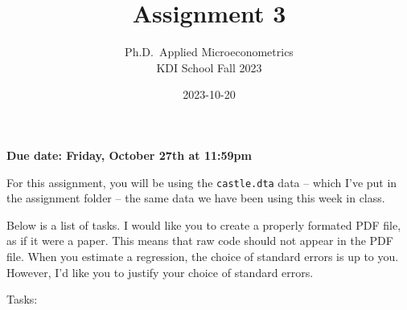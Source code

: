 \documentclass[
]{article}
\title{Assignment 3}
\subtitle{Ph.D.~Applied Microeconometrics\\
KDI School Fall 2023}
\author{}
\date{\vspace{-2.5em}2023-10-20}
\begin{document}
\maketitle

\textbf{Due date: Friday, October 27th at 11:59pm}

For this assignment, you will be using the \texttt{castle.dta} data -- which I've put in the assignment folder -- the same data we have been using this week in class.

Below is a list of tasks. I would like you to create a properly formated PDF file, as if it were a paper. This means that raw code should not appear in the PDF file. When you estimate a regression, the choice of standard errors is up to you. However, I'd like you to justify your choice of standard errors.

Tasks:
\end{document}
